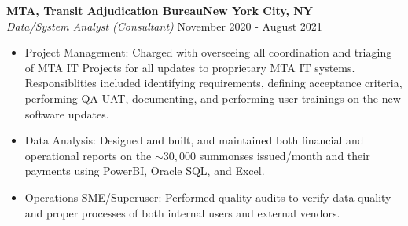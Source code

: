 \documentclass[a4paper]{article}
\begin{document}
\textbf{MTA, Transit Adjudication Bureau\hfill New York City, NY}\\
\textit{Data/System Analyst (Consultant)} \hfill November 2020 - August 2021\\
\vspace{-1mm}
\begin{itemize} \itemsep 1pt
    \item Project Management: Charged with overseeing all coordination and triaging of MTA IT Projects for all updates to proprietary MTA IT systems.
            Responsiblities included identifying requirements, defining acceptance criteria, performing QA UAT, documenting, and performing user trainings on the new software updates.
	\item Data Analysis: Designed and built, and maintained both financial and operational reports on the $\sim 30,000$ summonses issued/month and their payments using PowerBI, Oracle SQL, and Excel.
    \item Operations SME/Superuser: Performed quality audits to verify data quality and proper processes of both internal users and external vendors.
\end{itemize}
\end{document}
